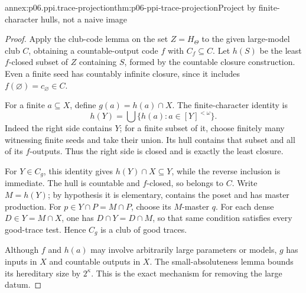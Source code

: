 \begin{annexitem}{annex:p06.ppi.trace-projection}{thm:p06-ppi-trace-projection}{Project by finite-character hulls, not a naive image}
\begin{proof}
Apply the club-code lemma on the set \(Z=H_\Theta\) to the given
large-model club \(C\), obtaining a countable-output code \(f\) with
\(C_f\subseteq C\). Let \(h(S)\) be the least \(f\)-closed subset
of \(Z\) containing \(S\), formed by the countable closure construction.
Even a finite seed has countably infinite closure, since it includes
\(f(\varnothing)=c_\varnothing\in C\).

For a finite \(a\subseteq X\), define \(g(a)=h(a)\cap X\).
The finite-character identity is
\[
 h(Y)=\bigcup\{h(a):a\in[Y]^{<\omega}\}.
\]
Indeed the right side contains \(Y\); for a finite subset of it,
choose finitely many witnessing finite seeds and take their union.
Its hull contains that subset and all of its \(f\)-outputs. Thus the
right side is closed and is exactly the least closure.

For \(Y\in C_g\), this identity gives \(h(Y)\cap X\subseteq Y\),
while the reverse inclusion is immediate. The hull is countable and
\(f\)-closed, so belongs to \(C\). Write \(M=h(Y)\); by hypothesis
it is elementary, contains the poset and has master production.
For \(p\in Y\cap P=M\cap P\), choose its \(M\)-master \(q\).
For each dense \(D\in Y=M\cap X\), one has
\(D\cap Y=D\cap M\), so that same condition satisfies every
good-trace test. Hence \(C_g\) is a club of good traces.

Although \(f\) and \(h(a)\) may involve arbitrarily large parameters
or models, \(g\) has inputs in \(X\) and countable outputs in \(X\).
The small-absoluteness lemma bounds its hereditary size by
\(2^\kappa\). This is the exact mechanism for removing the large datum.
\end{proof}
\end{annexitem}

